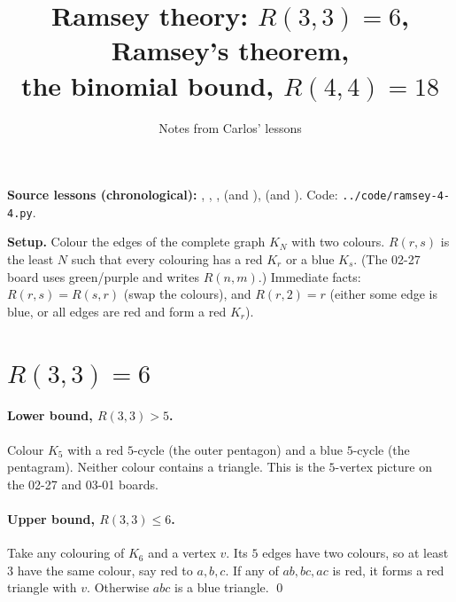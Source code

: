 \documentclass[11pt]{article}
\title{Ramsey theory: $R(3,3)=6$, Ramsey's theorem,\\ the binomial bound, $R(4,4)=18$}
\author{Notes from Carlos' lessons}
\date{}
\begin{document}
\maketitle

\textbf{Source lessons (chronological):}
,
,
,
 (and ),
 (and ).
Code: \texttt{../code/ramsey-4-4.py}.

\medskip
\textbf{Setup.} Colour the edges of the complete graph $K_N$ with two colours. $R(r,s)$ is the least $N$ such that every colouring has a red $K_r$ or a blue $K_s$. (The 02-27 board uses green/purple and writes $R(n,m)$.) Immediate facts: $R(r,s)=R(s,r)$ (swap the colours), and $R(r,2)=r$ (either some edge is blue, or all edges are red and form a red $K_r$).

\section{$R(3,3)=6$}

\paragraph{Lower bound, $R(3,3)>5$.} Colour $K_5$ with a red $5$-cycle (the outer pentagon) and a blue $5$-cycle (the pentagram). Neither colour contains a triangle. This is the $5$-vertex picture on the 02-27 and 03-01 boards.

\begin{center}
\end{center}

\paragraph{Upper bound, $R(3,3)\le6$.} Take any colouring of $K_6$ and a vertex $v$. Its $5$ edges have two colours, so at least $3$ have the same colour, say red to $a,b,c$. If any of $ab,bc,ac$ is red, it forms a red triangle with $v$. Otherwise $abc$ is a blue triangle. \qed
\end{document}
